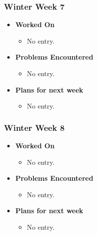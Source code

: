 \documentclass{article}
\begin{document}
\subsubsection{Winter Week 7}
\begin{itemize}
    \item {\textbf{Worked On}}
    \begin{itemize}
      \item No entry.
    \end{itemize}

    \item {\textbf{Problems Encountered}}
    \begin{itemize}
      \item No entry.
    \end{itemize}

    \item{\textbf{Plans for next week}}
    \begin{itemize}
      \item No entry.
    \end{itemize}

\end{itemize}

\subsubsection{Winter Week 8}
\begin{itemize}
    \item {\textbf{Worked On}}
    \begin{itemize}
      \item No entry.
    \end{itemize}

    \item {\textbf{Problems Encountered}}
    \begin{itemize}
      \item No entry.
    \end{itemize}

    \item{\textbf{Plans for next week}}
    \begin{itemize}
      \item No entry.
    \end{itemize}

\end{itemize}
\end{document}
